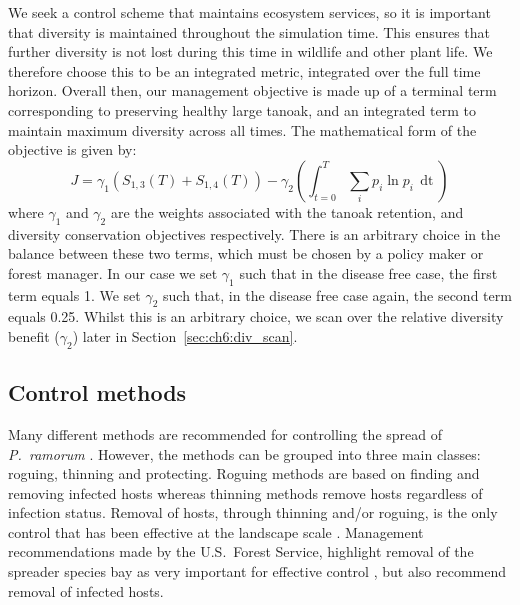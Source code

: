We seek a control scheme that maintains ecosystem services, so it is important that diversity is maintained throughout the simulation time. This ensures that further diversity is not lost during this time in wildlife and other plant life. We therefore choose this to be an integrated metric, integrated over the full time horizon. Overall then, our management objective is made up of a terminal term corresponding to preserving healthy large tanoak, and an integrated term to maintain maximum diversity across all times. The mathematical form of the objective is given by:
\begin{equation}\label{eqn:ch6:mgmt_obj}
    J = \gamma_1\left(S_{1,3}(T) + S_{1,4}(T)\right) - \gamma_2\left(\int_{t=0}^T \sum_ip_i\ln{p_i}\,\mathop{dt}\right)
\end{equation}
where $\gamma_1$ and $\gamma_2$ are the weights associated with the tanoak retention, and diversity conservation objectives respectively. There is an arbitrary choice in the balance between these two terms, which must be chosen by a policy maker or forest manager. In our case we set $\gamma_1$ such that in the disease free case, the first term equals 1. We set $\gamma_2$ such that, in the disease free case again, the second term equals 0.25. Whilst this is an arbitrary choice, we scan over the relative diversity benefit ($\gamma_2$) later in Section~\ref{sec:ch6:div_scan}.

\subsection{Control methods}

Many different methods are recommended for controlling the spread of \textit{P.~ramorum} \citep{swiecki_reference_2013}. However, the methods can be grouped into three main classes: roguing, thinning and protecting. Roguing methods are based on finding and removing infected hosts whereas thinning methods remove hosts regardless of infection status. Removal of hosts, through thinning and/or roguing, is the only control that has been effective at the landscape scale \citep{hansen_epidemiology_2008}. Management recommendations made by the U.S.\ Forest Service, highlight removal of the spreader species bay as very important for effective control \citep{swiecki_reference_2013}, but also recommend removal of infected hosts.

